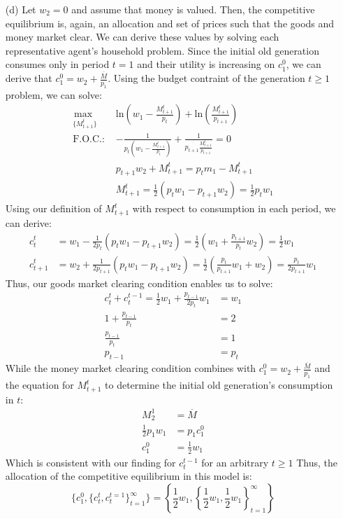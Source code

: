 \documentclass{article}
\newcommand{\loge}[1]{\text{ln}\left(#1\right)}
\newcommand{\usmax}[1]{\underset{\{#1\}}{\text{max }}}
\begin{document}
\begin{itemize}
	\item[(d)] Let $w_2=0$ and assume that money is valued. Then, the competitive equilibrium is, again, an allocation and set of prices such that the goods and money market clear. We can derive these values by solving each representative agent's household problem. Since the initial old generation consumes only in period $t=1$ and their utility is increasing on $c_1^0$, we can derive that $c_1^0=w_2 + \frac{\overline{M}}{p_1}$. Using the budget contraint of the generation $t\geq 1$ problem, we can solve:
		\begin{align*}
			\usmax{M_{t+1}^t}	&\loge{w_1-\frac{M_{t+1}^t}{p_t}} + \loge{\frac{M_{t+1}^t}{p_{t+1}}}									\\
			\text{F.O.C.: }		&-\frac{1}{p_t\left(w_1-\frac{M_{t+1}^t}{p_t}\right)} + \frac{1}{p_{t+1}\frac{M_{t+1}^t}{p_{t+1}}} = 0	\\
								&p_{t+1}w_2 + M^t_{t+1} = p_t m_1 - M_{t+1}^t															\\
								&M_{t+1}^t = \frac{1}{2}(p_tw_1-p_{t+1}w_2) = \frac{1}{2}p_tw_1
		\end{align*}
		Using our definition of $M_{t+1}^t$ with respect to consumption in each period, we can derive:
		\begin{align*}
			c_t^t 		&= w_1-\frac{1}{2p_t}(p_tw_1-p_{t+1}w_2) = \frac{1}{2}\left(w_1 + \frac{p_{t+1}}{p_t}w_2\right) = \frac{1}{2}w_1					\\
			c_{t+1}^t 	&= w_2 + \frac{1}{2p_{t+1}}(p_tw_1 - p_{t+1}w_2) = \frac{1}{2}\left(\frac{p_t}{p_{t+1}}w_1 + w_2\right) = \frac{p_t}{2p_{t+1}}w_1
		\end{align*}
		Thus, our goods market clearing condition enables us to solve:
		\begin{align*}
			c_t^t + c^{t-1}_t = \frac{1}{2}w_1 + \frac{p_{t-1}}{2p_t}w_1 	&= w_1	\\
								1 + \frac{p_{t-1}}{p_t}						&= 2	\\
								\frac{p_{t-1}}{p_t}							&= 1	\\
								p_{t-1}										&= p_t
		\end{align*}
		While the money market clearing condition combines with $c_1^0=w_2 + \frac{\overline{M}}{p_1}$ and the equation for $M_{t+1}^t$ to determine the initial old generation's consumption in $t$:
		\begin{align*}
			M_2^1 				&= \overline{M}	\\
			\frac{1}{2}p_1w_1 	&= p_1c_1^0		\\
			c_1^0				&= \frac{1}{2}w_1
		\end{align*}
		Which is consistent with our finding for $c^{t-1}_t$ for an arbitrary $t\geq 1$ Thus, the allocation of the competitive equilibrium in this model is:
		\[
			\{c_1^0,\{c_t^t,c_t^{t=1}\}_{t=1}^\infty\}=\left\{\frac{1}{2}w_1,\left\{\frac{1}{2}w_1,\frac{1}{2}w_1\right\}_{t=1}^\infty\right\}
		\]
		

\end{itemize}
\end{document}
